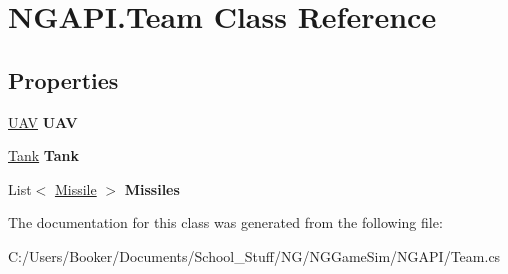 \hypertarget{class_n_g_a_p_i_1_1_team}{}\section{N\+G\+A\+P\+I.\+Team Class Reference}
\label{class_n_g_a_p_i_1_1_team}
\subsection*{Properties}
\begin{DoxyCompactItemize}
\item 
\mbox{\label{class_n_g_a_p_i_1_1_team_aa00426e6ac2407e06e55867e7897fd15}} 
\hyperlink{class_n_g_a_p_i_1_1_u_a_v}{U\+AV} {\bfseries U\+AV}
\item 
\mbox{\label{class_n_g_a_p_i_1_1_team_ad56c39151f824e05c7965999b1a902b0}} 
\hyperlink{class_n_g_a_p_i_1_1_tank}{Tank} {\bfseries Tank}
\item 
\mbox{\label{class_n_g_a_p_i_1_1_team_ab38ce5c24aac464c688b3e18e21ebbb8}} 
List$<$ \hyperlink{struct_n_g_a_p_i_1_1_missile}{Missile} $>$ {\bfseries Missiles}
\end{DoxyCompactItemize}


The documentation for this class was generated from the following file\+:\begin{DoxyCompactItemize}
\item 
C\+:/\+Users/\+Booker/\+Documents/\+School\+\_\+\+Stuff/\+N\+G/\+N\+G\+Game\+Sim/\+N\+G\+A\+P\+I/Team.\+cs\end{DoxyCompactItemize}
